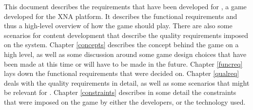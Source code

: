 This document describes the requirements that have been developed for \project,
a game developed for the XNA platform. It describes the functional requirements
and thus a high-level overview of how the game should play. There are also some
scenarios for content development that describe the quality requirements imposed
on the system. Chapter \ref{concepts} describes the concept behind the game on
a high level, as well as some discussion around some game design choices that
have been made at this time or will have to be made in the future. Chapter
\ref{funcreq} lays down the functional requirements that were decided on.
Chapter \ref{qualreq} deals with the quality requirements in detail, as well as
some scenarios that might be relevant for \project. Chapter \ref{constraints}
describes in some detail the constraints that were imposed on the game by either
the developers, or the technology used.
